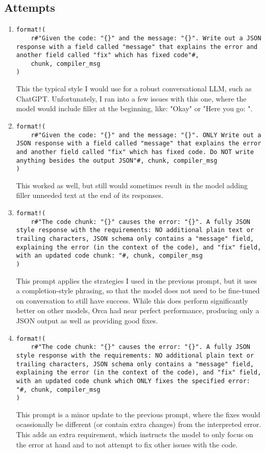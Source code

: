 \documentclass{article}
\begin{document}
	\subsection{Attempts}
		\begin{enumerate}
			\item
			\begin{verbatim}
format!(
	r#"Given the code: "{}" and the message: "{}". Write out a JSON response with a field called "message" that explains the error and another field called "fix" which has fixed code"#,
    chunk, compiler_msg
)
			\end{verbatim}
			This the typical style I would use for a robust conversational LLM, such as ChatGPT. Unfortunately, I ran into a few issues with this one, where the model would include filler at the beginning, like: "Okay" or "Here you go: ".

			\item
			\begin{verbatim}
format!(
	r#"Given the code: "{}" and the message: "{}". ONLY Write out a JSON response with a field called "message" that explains the error and another field called "fix" which has fixed code. Do NOT write anything besides the output JSON"#, chunk, compiler_msg
)

			\end{verbatim}
			This worked as well, but still would sometimes result in the model adding filler unneeded text at the end of its responses.

			\item
			\begin{verbatim}
format!(
	r#"The code chunk: "{}" causes the error: "{}". A fully JSON style response with the requirements: NO additional plain text or trailing characters, JSON schema only contains a "message" field, explaining the error (in the context of the code), and "fix" field, with an updated code chunk: "#, chunk, compiler_msg
)
			\end{verbatim}
			This prompt applies the strategies I used in the previous prompt, but it uses a completion-style phrasing, so that the model does not need to be fine-tuned on conversation to still have success. While this does perform significantly better on other models, Orca had near perfect performance, producing only a JSON output as well as providing good fixes.

			\item
			\begin{verbatim}
format!(
	r#"The code chunk: "{}" causes the error: "{}". A fully JSON style response with the requirements: NO additional plain text or trailing characters, JSON schema only contains a "message" field, explaining the error (in the context of the code), and "fix" field, with an updated code chunk which ONLY fixes the specified error: "#, chunk, compiler_msg
)
			\end{verbatim}
			This prompt is a minor update to the previous prompt, where the fixes would ocassionally be different (or contain extra changes) from the interpreted error. This adds an extra requirement, which instructs the model to only focus on the error at hand and to not attempt to fix other issues with the code.


\end{enumerate}
\end{document}
